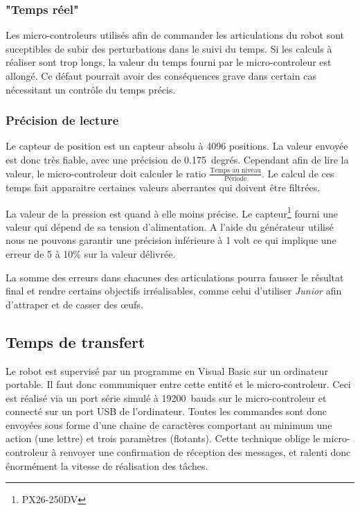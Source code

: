 \subsubsection*{"Temps r\'eel"}

 Les micro-controleurs utilis\'es afin de commander les articulations du robot sont suceptibles de subir des perturbations dans le suivi du temps.
 Si les calculs \`a r\'ealiser sont trop longs, la valeur du temps fourni par le micro-controleur est allong\'e.
 Ce d\'efaut pourrait avoir des cons\'equences grave dans certain cas n\'ecessitant un contr\^ole du temps pr\'ecis.
 
 
 \subsubsection*{Pr\'ecision de lecture}
 
 Le capteur de position est un capteur absolu \`a 4096 positions.
 La valeur envoy\'ee est donc tr\`es fiable, avec une pr\'ecision de 0.175~degr\'es.
 Cependant afin de lire la valeur, le micro-controleur doit calculer le ratio $\frac{\text{Temps au niveau}}{\text{P\'eriode}}$.
 Le calcul de ces temps fait apparaitre certaines valeurs aberrantes qui doivent \^etre filtr\'ees.
 
 La valeur de la pression est quand \`a elle moins pr\'ecise.
 Le capteur\footnote{PX26-250DV} fourni une valeur qui d\'epend de sa tension d'alimentation.
 A l'aide du g\'en\'erateur utilis\'e nous ne pouvons garantir une pr\'ecision inf\'erieure \`a 1 volt ce qui implique une erreur de 5 \`a 10\% sur la valeur d\'elivr\'ee.
 
La somme des erreurs dans chacunes des articulations pourra fausser le r\'esultat final et rendre certains objectifs irr\'ealisables, comme celui d'utiliser \emph{Junior} afin d'attraper et de casser des {\oe}ufs.
 
 \subsection*{Temps de transfert}
 
Le robot est supervis\'e par un programme en Visual Basic sur un ordinateur portable.
Il faut donc communiquer entre cette entit\'e et le micro-controleur.
Ceci est r\'ealis\'e via un port s\'erie simul\'e \`a 19200~bauds sur le micro-controleur et connect\'e sur un port USB de l'ordinateur.
Toutes les commandes sont donc envoy\'ees sous forme d'une chaine de caract\`eres comportant au minimum une action (une lettre) et trois param\`etres (flotants).
Cette technique oblige le micro-controleur \`a renvoyer une confirmation de r\'eception des messages, et ralenti donc \'enorm\'ement la vitesse de r\'ealisation des t\^aches.

